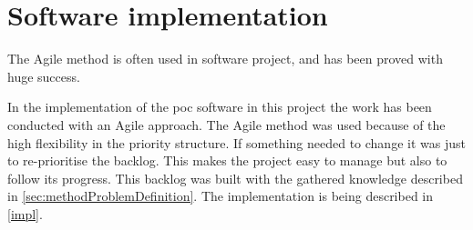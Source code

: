 \section{Software implementation}\label{sec:methodSoftwareImplementation}
The Agile method is often used in software project, and has been proved with huge success. \cite{DoesAgileWork2015}

\bigskip

In the implementation of the \acrshort{poc} software in this project the work has been conducted with an Agile approach. 
The Agile method was used because of the high flexibility in the priority structure.
If something needed to change it was just to re-prioritise the backlog.
This makes the project easy to manage but also to follow its progress.
This backlog was built with the gathered knowledge described in  \cref{sec:methodProblemDefinition}.
The implementation is being described in \cref{impl}.
